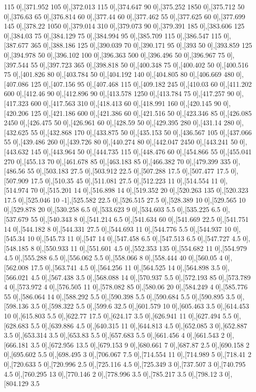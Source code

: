 {115 0],[371.952 105 0],[372.013 115 0],[374.647 90 0],[375.252 1850 0],[375.712 50 0],[376.63 65 0],[376.814 60 0],[377.44 60 0],[377.462 55 0],[377.625 60 0],[377.699 145 0],[378.22 1050 0],[379.014 310 0],[379.073 90 0],[379.391 185 0],[383.606 125 0],[384.03 75 0],[384.129 75 0],[384.994 95 0],[385.709 115 0],[386.547 115 0],[387.677 365 0],[388.186 125 0],[390.039 70 0],[390.171 95 0],[393 50 0],[393.859 125 0],[394.978 50 0],[396.102 100 0],[396.363 500 0],[396.496 50 0],[396.967 75 0],[397.544 55 0],[397.723 365 0],[398.818 50 0],[400.348 75 0],[400.402 50 0],[400.516 75 0],[401.826 80 0],[403.784 50 0],[404.192 140 0],[404.805 80 0],[406.669 480 0],[407.086 125 0],[407.156 95 0],[407.468 115 0],[409.182 245 0],[410.03 60 0],[411.202 600 0],[412.46 90 0],[412.896 90 0],[413.578 1250 0],[413.784 75 0],[417.257 90 0],[417.323 600 0],[417.563 310 0],[418.413 60 0],[418.991 160 0],[420.145 90 0],[420.206 125 0],[421.186 600 0],[421.386 60 0],[421.516 50 0],[423.346 85 0],[426.085 2450 0],[426.475 50 0],[426.961 60 0],[428.59 50 0],[429.395 280 0],[431.14 280 0],[432.625 55 0],[432.868 170 0],[433.875 50 0],[435.153 50 0],[436.567 105 0],[437.066 55 0],[439.486 260 0],[439.726 80 0],[440.274 80 0],[442.047 2450 0],[443.241 50 0],[443.632 145 0],[443.964 50 0],[444.735 115 0],[448.476 60 0],[454.866 55 0],[455.041 270 0],[455.13 70 0],[461.678 85 0],[463.183 85 0],[466.382 70 0],[479.399 335 0],[486.56 55 0],[503.183 27.5 0],[503.912 22.5 0],[507.288 17.5 0],[507.477 17.5 0],[507.909 17.5 0],[510.35 45 0],[511.081 27.5 0],[512.223 11 0],[514.554 11 0],[514.974 70 0],[515.201 14 0],[516.898 14 0],[519.352 20 0],[520.263 135 0],[520.323 17.5 0],[525.046 10 -1],[525.582 22.5 0],[526.515 27.5 0],[528.389 10 0],[529.565 10 0],[529.878 20 0],[530.258 6.5 0],[533.623 9 0],[534.603 5.5 0],[535.225 6.5 0],[537.679 55 0],[540.343 8 0],[541.214 6.5 0],[541.634 60 0],[541.669 22.5 0],[541.751 14 0],[544.182 8 0],[544.331 27.5 0],[544.693 11 0],[544.776 5.5 0],[544.937 10 0],[545.34 10 0],[545.73 11 0],[547 14 0],[547.458 6.5 0],[547.513 6.5 0],[547.727 4.5 0],[548.185 8 0],[550.933 11 0],[551.601 4.5 0],[552.353 135 0],[554.682 11 0],[554.979 4.5 0],[555.288 6.5 0],[556.062 5.5 0],[558.066 8 0],[558.444 40 0],[560.05 4 0],[562.008 17.5 0],[563.741 4.5 0],[564.256 11 0],[564.525 14 0],[564.898 3.5 0],[566.021 4.5 0],[567.438 3.5 0],[568.088 14 0],[570.937 5.5 0],[572.193 85 0],[573.789 4 0],[573.972 4 0],[576.505 11 0],[578.082 85 0],[580.06 20 0],[584.249 4 0],[585.776 55 0],[586.064 14 0],[588.292 5.5 0],[590.398 5.5 0],[590.684 5.5 0],[590.895 3.5 0],[598.136 3.5 0],[598.322 5.5 0],[599.6 32.5 0],[601.579 10 0],[605.463 3.5 0],[614.453 10 0],[615.803 5.5 0],[622.77 17.5 0],[624.17 3.5 0],[626.941 11 0],[627.494 5.5 0],[628.683 5.5 0],[639.886 4.5 0],[640.315 11 0],[644.813 4.5 0],[652.085 3 0],[652.887 3.5 0],[653.314 3.5 0],[653.83 5.5 0],[657.683 5.5 0],[661.456 4 0],[661.543 2 0],[666.181 3.5 0],[672.956 13.5 0],[679.153 9 0],[680.661 7 0],[687.87 2.5 0],[690.158 2 0],[695.602 5.5 0],[698.495 3 0],[706.067 7.5 0],[714.554 11 0],[714.989 5 0],[718.41 2 0],[720.633 5 0],[720.996 2.5 0],[725.116 4.5 0],[725.349 3 0],[737.507 3 0],[740.795 4.5 0],[760.295 13 0],[770.146 2 0],[778.996 3.5 0],[785.217 3.5 0],[798.12 3 0],[804.129 3.5 }
